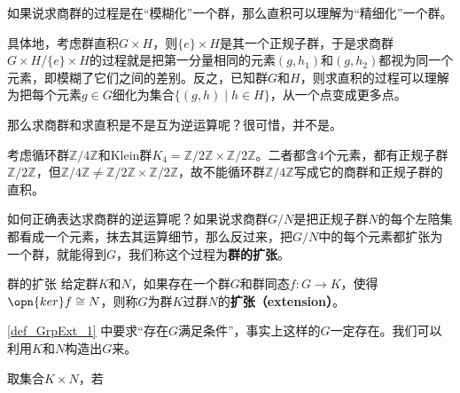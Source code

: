 


如果说求商群的过程是在“模糊化”一个群，那么直积可以理解为“精细化”一个群。

具体地，考虑群直积$G\times H$，则$\{e\}\times H$是其一个正规子群，于是求商群$G\times H/\{e\}\times H$的过程就是把第一分量相同的元素$(g, h_1)$和$(g, h_2)$都视为同一个元素，即模糊了它们之间的差别。反之，已知群$G$和$H$，则求直积的过程可以理解为把每个元素$g\in G$细化为集合$\{(g, h)\mid h\in H\}$，从一个点变成更多点。


那么求商群和求直积是不是互为逆运算呢？很可惜，并不是。



\begin{example}{}
考虑循环群$\mathbb{Z}/4\mathbb{Z}$和Klein群$K_4=\mathbb{Z}/2\mathbb{Z}\times \mathbb{Z}/2\mathbb{Z}$。二者都含$4$个元素，都有正规子群$\mathbb{Z}/2\mathbb{Z}$，但$\mathbb{Z}/4\mathbb{Z}\neq \mathbb{Z}/2\mathbb{Z}\times \mathbb{Z}/2\mathbb{Z}$，故不能循环群$\mathbb{Z}/4\mathbb{Z}$写成它的商群和正规子群的直积。
\end{example}




如何正确表达求商群的逆运算呢？如果说求商群$G/N$是把正规子群$N$的每个左陪集都看成一个元素，抹去其运算细节，那么反过来，把$G/N$中的每个元素都扩张为一个群，就能得到$G$，我们称这个过程为\textbf{群的扩张}。



\begin{definition}{群的扩张}\label{def_GrpExt_1}
给定群$K$和$N$，如果存在一个群$G$和群同态$f:G\to K$，使得$\opn{ker}f\cong N$，则称$G$为群$K$过群$N$的\textbf{扩张（extension）}。
\end{definition}


\autoref{def_GrpExt_1} 中要求“存在$G$满足条件”，事实上这样的$G$一定存在。我们可以利用$K$和$N$构造出$G$来。

取集合$K\times N$，若

































